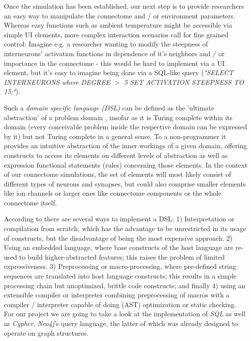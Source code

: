\documentclass[a4paper,11pt]{article}
\begin{document}
Once the simulation has been established, our next step is to provide researchers an easy way to manipulate the connectome and / or environment parameters. Whereas easy functions such as ambient temperature might be accessible via simple UI elements, more complex interaction scenarios call for fine grained control: Imagine e.g. a researcher wanting to modify the steepness of interneurons' activation functions in dependence of it's neighbors and / or importance in the connectome - this would be hard to implement via a UI element, but it's easy to imagine being done via a SQL-like query (\textit{"SELECT INTERNEURONS where DEGREE $>$ 5 SET ACTIVATION STEEPNESS TO 15;"}).

Such a \textit{domain specific language (DSL)} can be defined as the 'ultimate abstraction' of a problem domain \citep{Hudak1998DSL}, insofar as it is Turing complete within its domain (every conceivable problem inside the respective domain can be expressed by it) but not Turing complete in a general sense. To a non-programmer it provides an intuitive abstraction of the inner workings of a given domain, offering constructs to access its elements on different levels of abstraction as well as expression functional statements (rules) concerning those elements. In the context of our connectome simulations, the set of elements will most likely consist of different types of neurons and synapses, but could also comprise smaller elements like ion channels or larger ones like connectome components or the whole connectome itself.

According to \citep{Deursen2000DSLImplementation} there are several ways to implement a DSL: 1) Interpretation or compilation from scratch, which has the advantage to be unrestricted in its usage of constructs, but the disadvantage of being the most expensive approach. 2) Using an embedded language, where base constructs of the host language are re-used to build higher-abstracted features; this raises the problem of limited expressiveness. 3) Preprocessing or macro-processing, where pre-defined string sequences are translated into host language constructs; this results in a simple processing chain but unoptimized, brittle code constructs; and finally 4) using an extensible compiler or interpreter combining preprocessing of macros with a compiler / interpreter capable of doing (AST) optimization or static checking. For our project we are going to take a look at the implementation of \emph{SQL} as well as \emph{Cypher}, \emph{Neo4j}’s query language, the latter of which was already designed to operate on graph structures.
\\[0,2cm]
\end{document}
